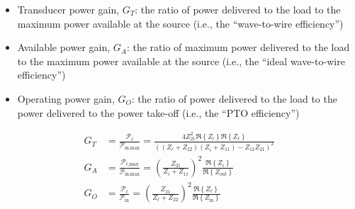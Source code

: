 \documentclass[twocolumn]{autart}
\begin{document}
\begin{itemize}
        \item Transducer power gain, $G_T$: the ratio of power delivered to the load to the maximum power available at the source (i.e., the ``wave-to-wire efficiency'')
        \item Available power gain, $G_A$: the ratio of maximum power delivered to the load to the maximum power available at the source (i.e., the ``ideal wave-to-wire efficiency'')
        \item Operating power gain, $G_O$: the ratio of power delivered to the load to the power delivered to the power take-off (i.e., the ``PTO efficiency'')
\end{itemize}
%
\begin{subequations}
\begin{align}
        G_T &= \frac{\mathcal{P}_\ell}{\mathcal{P}_{\textrm{in,max}}}  = \frac{4 Z_{21}^2 \Re \left\{ Z_i \right\}\Re \left\{ Z_{\ell} \right\}}{((Z_{\ell} + Z_{22})(Z_i + Z_{11}) - Z_{12}Z_{21})^2} 
        \label{eq:transducer_gain}
        \\[1em]
        G_A &= \frac{\mathcal{P}_{\ell\textrm{,max}}}{\mathcal{P}_{\textrm{in,max}}} = \left(\frac{Z_{21}}{Z_i + Z_{11}}\right)^2\frac{\Re \left\{ Z_i \right\}}{\Re \left\{ Z_{\textrm{out}} \right\}}
        \label{eq:available_gain}
        \\[1em]
        G_O &= \frac{\mathcal{P}_\ell}{\mathcal{P}_{\textrm{in}}}  =  \left(\frac{Z_{21}}{Z_{\ell} + Z_{22}}\right)^2\frac{\Re \left\{ Z_{\ell} \right\}}{\Re \left\{ Z_{\textrm{in}} \right\}} 
        \label{eq:operating_gain}
\end{align}
\label{eq:gains}
\end{subequations}
\end{document}
